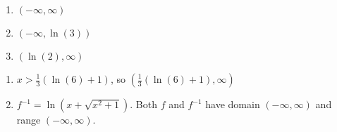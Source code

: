 \begin{multicols}{3} 
\begin{enumerate}
\setcounter{enumi}{\value{HW}}


\item    $(-\infty, \infty)$  

\item     $(-\infty, \ln(3))$

\item    $(\ln(2), \infty) $  

\setcounter{HW}{\value{enumi}}
\end{enumerate}
\end{multicols}


\begin{enumerate}
\setcounter{enumi}{\value{HW}}


\item $x > \frac{1}{3}(\ln(6) + 1)$, so $\left(\frac{1}{3}(\ln(6) + 1), \infty \right)$ 

\item  $f^{-1} = \ln\left(x + \sqrt{x^{2} + 1}\right)$. Both $f$ and $f^{-1}$ have domain $(-\infty, \infty)$ and range $(-\infty, \infty)$.


\end{enumerate}
